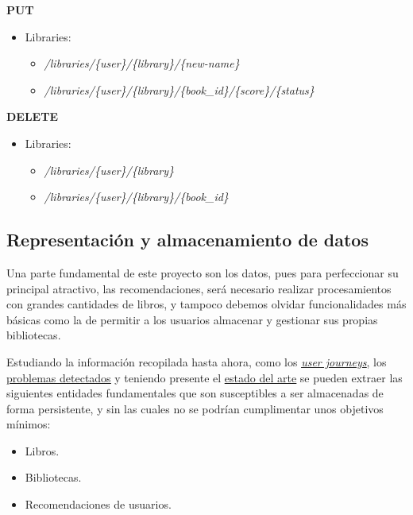 \textbf{PUT}
\begin{itemize}
    \item Libraries:
    \begin{itemize}
        \item \textit{/libraries/\{user\}/\{library\}/\{new-name\}}
        \item \textit{/libraries/\{user\}/\{library\}/\{book\_id\}/\{score\}/\{status\}}
    \end{itemize}
\end{itemize}

\textbf{DELETE}
\begin{itemize}
    \item Libraries:
    \begin{itemize}
        \item \textit{/libraries/\{user\}/\{library\}}
        \item \textit{/libraries/\{user\}/\{library\}/\{book\_id\}}
    \end{itemize}
\end{itemize}

\subsection{Representación y almacenamiento de datos}

Una parte fundamental de este proyecto son los datos, pues para perfeccionar su principal atractivo, las recomendaciones, será necesario realizar procesamientos con grandes cantidades de libros, y tampoco debemos olvidar funcionalidades más básicas como la de permitir a los usuarios almacenar y gestionar sus propias bibliotecas.

Estudiando la información recopilada hasta ahora, como los \hyperref[user journeys]{\textit{\underline{user journeys}}}, los \hyperref[problemas de los usuarios]{\underline{problemas detectados}} y teniendo presente el \hyperref[Estado del arte]{\underline{estado del arte}} se pueden extraer las siguientes entidades fundamentales que son susceptibles a ser almacenadas de forma persistente, y sin las cuales no se podrían cumplimentar unos objetivos mínimos:

\begin{itemize}
    \item Libros.
    \item Bibliotecas.
    \item Recomendaciones de usuarios.
\end{itemize}


